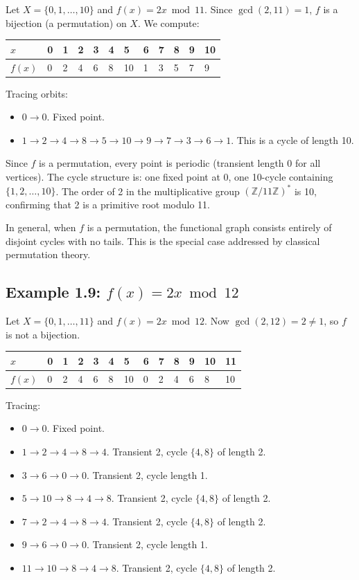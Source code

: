 Let $X = \{ 0, 1, \ldots, 10\} $ and $f(x) = 2x \bmod 11$. Since $\gcd(2, 11) = 1$, $f$ is a bijection (a permutation) on $X$. We compute:

\begin{tabular}{|l|l|l|l|l|l|l|l|l|l|l|l|}
\hline
$x$ & 0 & 1 & 2 & 3 & 4 & 5 & 6 & 7 & 8 & 9 & 10 \\
\hline
$f(x)$ & 0 & 2 & 4 & 6 & 8 & 10 & 1 & 3 & 5 & 7 & 9 \\
\hline
\end{tabular}


Tracing orbits:
\begin{itemize}
  \item $0 \to 0$. Fixed point.
  \item $1 \to 2 \to 4 \to 8 \to 5 \to 10 \to 9 \to 7 \to 3 \to 6 \to 1$. This is a cycle of length 10.
\end{itemize}

Since $f$ is a permutation, every point is periodic (transient length 0 for all vertices). The cycle structure is: one fixed point at 0, one 10-cycle containing $\{ 1, 2, \ldots, 10\} $. The order of 2 in the multiplicative group $(\mathbb{Z}/11\mathbb{Z})^*$ is 10, confirming that 2 is a primitive root modulo 11.

In general, when $f$ is a permutation, the functional graph consists entirely of disjoint cycles with no tails. This is the special case addressed by classical permutation theory.

\subsection{Example 1.9: $f(x) = 2x \bmod 12$}

Let $X = \{ 0, 1, \ldots, 11\} $ and $f(x) = 2x \bmod 12$. Now $\gcd(2, 12) = 2 \neq 1$, so $f$ is not a bijection.

\begin{tabular}{|l|l|l|l|l|l|l|l|l|l|l|l|l|}
\hline
$x$ & 0 & 1 & 2 & 3 & 4 & 5 & 6 & 7 & 8 & 9 & 10 & 11 \\
\hline
$f(x)$ & 0 & 2 & 4 & 6 & 8 & 10 & 0 & 2 & 4 & 6 & 8 & 10 \\
\hline
\end{tabular}


Tracing:
\begin{itemize}
  \item $0 \to 0$. Fixed point.
  \item $1 \to 2 \to 4 \to 8 \to 4$. Transient 2, cycle $\{ 4, 8\} $ of length 2.
  \item $3 \to 6 \to 0 \to 0$. Transient 2, cycle length 1.
  \item $5 \to 10 \to 8 \to 4 \to 8$. Transient 2, cycle $\{ 4, 8\} $ of length 2.
  \item $7 \to 2 \to 4 \to 8 \to 4$. Transient 2, cycle $\{ 4, 8\} $ of length 2.
  \item $9 \to 6 \to 0 \to 0$. Transient 2, cycle length 1.
  \item $11 \to 10 \to 8 \to 4 \to 8$. Transient 2, cycle $\{ 4, 8\} $ of length 2.
\end{itemize}

